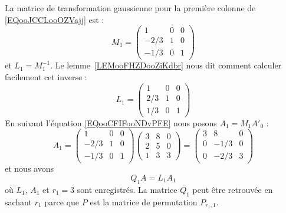 \begin{example}
    La matrice de transformation gaussienne pour la première colonne de \eqref{EQooJCCLooOZVajj} est :
    \begin{equation}
        M_1=\begin{pmatrix}
            1    &   0    &   0    \\
            -2/3    &   1    &   0    \\
            -1/3    &   0    &   1
        \end{pmatrix}
    \end{equation}
    et \( L_1=M_1^{-1}\). Le lemme~\ref{LEMooFHZDooZiKdbr} nous dit comment calculer facilement cet inverse :
    \begin{equation}
        L_1=\begin{pmatrix}
            1    &   0    &   0    \\
            2/3    &   1    &   0    \\
            1/3    &   0    &   1
        \end{pmatrix}
    \end{equation}
    En suivant l'équation \eqref{EQooCFIFooNDvPFE} nous posons \( A_1=M_1A'_0\) :
    \begin{equation}        \label{EQooUBRPooRJbCYn}
        A_1=
        \begin{pmatrix}
            1    &   0    &   0    \\
            -2/3    &   1    &   0    \\
            -1/3    &   0    &   1
        \end{pmatrix}
        \begin{pmatrix}
            3    &   8    &   0    \\
            2    &   5    &   0    \\
            1    &   3    &   3
        \end{pmatrix}=
        \begin{pmatrix}
            3    &   8    &   0    \\
            0    &   -1/3    &   0    \\
            0    &   -2/3    &   3
        \end{pmatrix}
    \end{equation}
    et nous avons
    \begin{equation}
        Q_1A=L_1A_1
    \end{equation}
    où \( L_1\), \( A_1\) et \( r_1=3\) sont enregistrés. La matrice \( Q_1\) peut être retrouvée en sachant \( r_1\) parce que \( P\) est la matrice de permutation \( P_{r_1,1}\).


\end{example}
